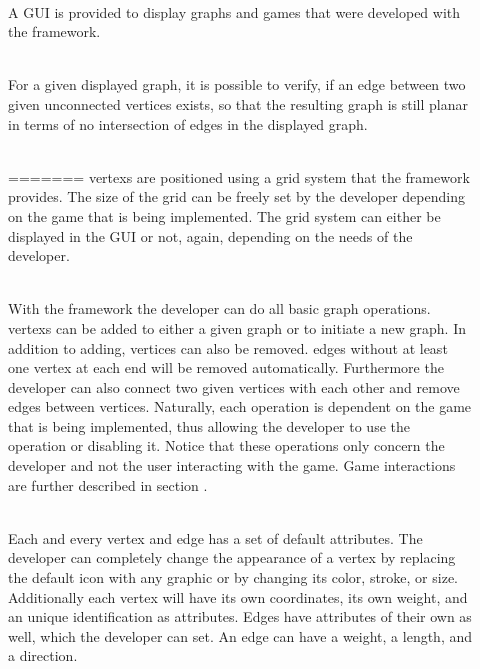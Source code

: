 \begin{description}
 	\item[] \textbf{} \\
 	A \gls{GUI} is provided to display graphs and games that were developed with the framework. 
	\item[] \textbf{} \\
	For a given displayed graph, it is possible to verify, if an edge between two given unconnected vertices exists, so that the resulting graph is still \gls{planar} in terms of no intersection of edges in the displayed graph.
	\item[] \textbf{} \\
=======
	\Glspl{vertex} are positioned using a grid system that the \gls{framework} provides. The size of the grid can be freely set by the \gls{developer} depending on the game that is being implemented. The grid system can either be displayed in the \gls{GUI} or not, again, depending on the needs of the developer.
  	\item[] \textbf{} \\
	With the framework the developer can do all basic graph operations. \Glspl{vertex} can be added to either a given \gls{graph} or to initiate a new graph. In addition to adding, vertices can also be removed. \Glspl{edge} without at least one vertex at each end will be removed automatically. Furthermore the developer can also connect two given vertices with each other and remove edges between vertices. Naturally, each operation is dependent on the game that is being implemented, thus allowing the developer to use the operation or disabling it. Notice that these operations only concern the developer and not the user interacting with the game. Game interactions are further described in section .
	\item[] \textbf{} \\
	Each and every vertex and edge has a set of default attributes. The developer can completely change the appearance of a vertex by replacing the default icon with any graphic or by changing its color, stroke, or size. \\
	Additionally each vertex will have its own coordinates, its own weight, and an unique identification as attributes. Edges have attributes of their own as well, which the developer can set. An edge can have a weight, a length, and a direction.

\end{description}
